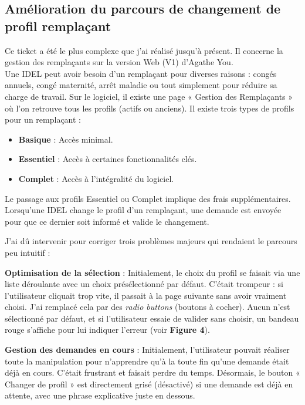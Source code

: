 \documentclass{article}
\begin{document}
\subsection{Amélioration du parcours de changement de profil remplaçant}

Ce ticket a été le plus complexe que j'ai réalisé jusqu'à présent. Il concerne la gestion des remplaçants sur la version Web (V1) d'Agathe You.\\

Une IDEL peut avoir besoin d'un remplaçant pour diverses raisons : congés annuels, congé maternité, arrêt maladie ou tout simplement pour réduire sa charge de travail. Sur le logiciel, il existe une page « Gestion des Remplaçants » où l'on retrouve tous les profils (actifs ou anciens). Il existe trois types de profils pour un remplaçant :

\begin{itemize}
    \item \textbf{Basique} : Accès minimal.
    \item \textbf{Essentiel} : Accès à certaines fonctionnalités clés.
    \item \textbf{Complet} : Accès à l'intégralité du logiciel.
\end{itemize}

Le passage aux profils Essentiel ou Complet implique des frais supplémentaires. Lorsqu'une IDEL change le profil d'un remplaçant, une demande est envoyée pour que ce dernier soit informé et valide le changement.


J'ai dû intervenir pour corriger trois problèmes majeurs qui rendaient le parcours peu intuitif :

\textbf{Optimisation de la sélection} :
Initialement, le choix du profil se faisait via une liste déroulante avec un choix présélectionné par défaut. C'était trompeur : si l'utilisateur cliquait trop vite, il passait à la page suivante sans avoir vraiment choisi. J'ai remplacé cela par des \textit{radio buttons} (boutons à cocher). Aucun n'est sélectionné par défaut, et si l'utilisateur essaie de valider sans choisir, un bandeau rouge s'affiche pour lui indiquer l'erreur (voir \textbf{Figure 4}).


\textbf{Gestion des demandes en cours} :
Initialement, l'utilisateur pouvait réaliser toute la manipulation pour n'apprendre qu'à la toute fin qu'une demande était déjà en cours. C'était frustrant et faisait perdre du temps. Désormais, le bouton « Changer de profil » est directement grisé (désactivé) si une demande est déjà en attente, avec une phrase explicative juste en dessous.
\end{document}
